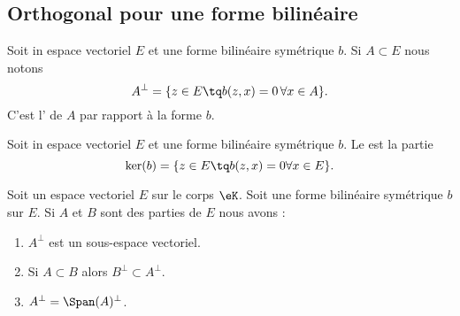 \subsection{Orthogonal pour une forme bilinéaire}

\begin{definition}	\label{DEFooENZGooXMWfUy}
	Soit in espace vectoriel \( E\) et une forme bilinéaire symétrique \( b\). Si \( A\subset E\) nous notons
	\begin{equation}
		A^{\perp}=\{ z\in E\tq b(z,x)=0\,\forall x\in A \}.
	\end{equation}
	C'est l' de \( A\) par rapport à la forme \( b\).
\end{definition}

\begin{definition}		\label{DEFooQQBQooKJdwxO}
	Soit in espace vectoriel \( E\) et une forme bilinéaire symétrique \( b\). Le  est la partie
	\begin{equation}
		\ker(b)=\{ z\in E\tq b(z,x)=0\forall x\in E \}.
	\end{equation}
\end{definition}

\begin{proposition}		\label{PROPooWPKRooUAnVzd}
	Soit un espace vectoriel \( E\) sur le corps \( \eK\). Soit une forme bilinéaire symétrique \( b\) sur \( E\). Si \( A\) et \( B\) sont des parties de \( E\) nous avons :
	\begin{enumerate}
		\item		\label{ITEMooCGEIooKpSNXS}
		      \( A^{\perp}\) est un sous-espace vectoriel.
		\item	\label{ITEMooRRAOooTaVYgm}
		      Si \( A\subset B\) alors \( B^{\perp}\subset A^{\perp}\).
		\item	\label{ITEMooBKXFooEpObWC}
		      \( A^{\perp}=\Span(A)^{\perp}\).
	\end{enumerate}
\end{proposition}

